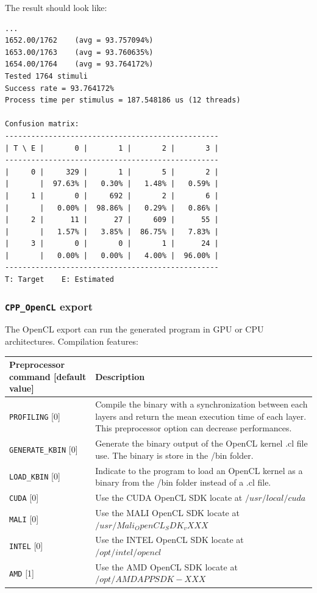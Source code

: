 \documentclass[a4paper,11pt,oneside]{article}
\newcommand{\iponly}{\reversemarginpar
    \marginnote{\color{listletiblue}\normalfont\scriptsize
    {\ttfamily{}\hyperref[sec:N2D2-IP]{\color{listletiblue}N2D2 IP}} \emph{only}}}
\begin{document}
The result should look like:
\begin{lstlisting}[style=console]
...
1652.00/1762    (avg = 93.757094%)
1653.00/1763    (avg = 93.760635%)
1654.00/1764    (avg = 93.764172%)
Tested 1764 stimuli
Success rate = 93.764172%
Process time per stimulus = 187.548186 us (12 threads)

Confusion matrix:
-------------------------------------------------
| T \ E |       0 |       1 |       2 |       3 |
-------------------------------------------------
|     0 |     329 |       1 |       5 |       2 |
|       |  97.63% |   0.30% |   1.48% |   0.59% |
|     1 |       0 |     692 |       2 |       6 |
|       |   0.00% |  98.86% |   0.29% |   0.86% |
|     2 |      11 |      27 |     609 |      55 |
|       |   1.57% |   3.85% |  86.75% |   7.83% |
|     3 |       0 |       0 |       1 |      24 |
|       |   0.00% |   0.00% |   4.00% |  96.00% |
-------------------------------------------------
T: Target    E: Estimated
\end{lstlisting}

\subsubsection{\texorpdfstring{%
\lstinline[basicstyle=\ttfamily\bfseries]!CPP_OpenCL! export\protect\iponly}
{CPP\_OpenCL export}}
The OpenCL export can run the generated program in GPU or CPU architectures.
Compilation features:
\begin{center}
 \begin{tabular}{| p{7cm} | p{8cm} | }
 \hline
 Preprocessor command [default value] & Description\\
 \hline\hline
  \lstinline!PROFILING! [0] & Compile the binary with a synchronization between
   each layers and return the mean execution time of each layer.
  This preprocessor option can decrease performances.\\
  \lstinline!GENERATE_KBIN! [0] & Generate the binary output of the OpenCL
  kernel .cl file use. The binary is store in the /bin folder. \\
  \lstinline!LOAD_KBIN! [0] & Indicate to the program to load an OpenCL
  kernel as a binary from the /bin folder instead of a .cl file. \\
  \lstinline!CUDA! [0] & Use the CUDA OpenCL SDK locate at
  ${/usr/local/cuda}$ \\
  \lstinline!MALI! [0] & Use the MALI OpenCL SDK locate at
  ${/usr/Mali_OpenCL_SDK_vXXX}$ \\
  \lstinline!INTEL! [0] & Use the INTEL OpenCL SDK locate at
  ${/opt/intel/opencl}$ \\
  \lstinline!AMD! [1] & Use the AMD OpenCL SDK locate at
  ${/opt/AMDAPPSDK-XXX}$ \\
 \hline
\end{tabular}
\end{center}
\end{document}
